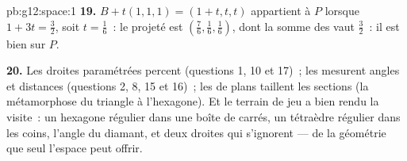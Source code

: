 \begin{solution}{pb:g12:space:1}
\textbf{19.} $B + t(1,1,1) = (1 + t, t, t)$ appartient à $P$
lorsque $1 + 3t = \frac32$, soit $t = \frac16$~: le projeté est
$\left(\frac76, \frac16, \frac16\right)$, dont la somme des
 vaut $\frac32$~: il est bien sur $P$.

\textbf{20.} Les droites paramétrées percent (questions 1, 10 et
17)~; les  mesurent angles et distances (questions
2, 8, 15 et 16)~; les  de plans taillent les sections (la
métamorphose du triangle à l'hexagone). Et le terrain de jeu a bien
rendu la visite~: un hexagone régulier dans une boîte de carrés, un
tétraèdre régulier dans les coins, l'angle du diamant, et deux
droites qui s'ignorent --- de la géométrie que seul l'espace peut
offrir.
\end{solution}
